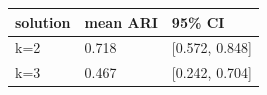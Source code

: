 \begin{tabular}{lll}
\toprule
solution & mean ARI & 95\% CI \\
\midrule
k=2 & 0.718 & [0.572, 0.848] \\
k=3 & 0.467 & [0.242, 0.704] \\
\bottomrule
\end{tabular}
